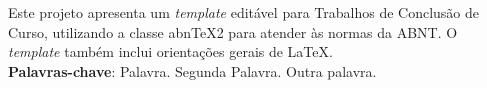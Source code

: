 
\begin{resumo}[RESUMO]

    \begin{SingleSpacing}
    
        Este projeto apresenta um \emph{template} editável para Trabalhos de Conclusão de Curso, utilizando a classe abn\TeX{}2 para atender às normas da ABNT. O \emph{template} também inclui orientações gerais de \LaTeX{}. \\
        
        \textbf{Palavras-chave}: Palavra. Segunda Palavra. Outra palavra.
    
    \end{SingleSpacing}
    
\end{resumo}
